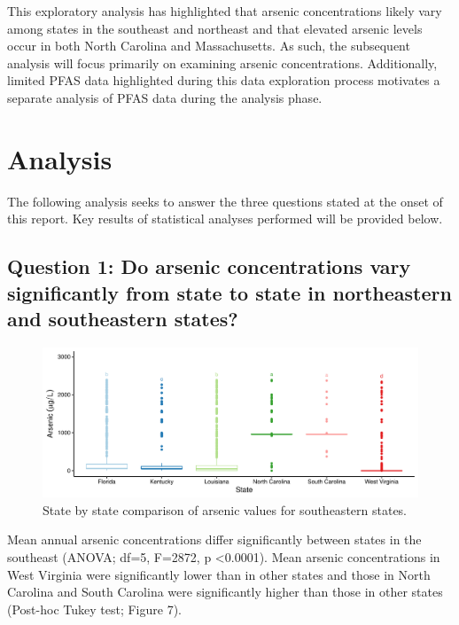 \documentclass[12pt,]{article}
\begin{document}
This exploratory analysis has highlighted that arsenic concentrations
likely vary among states in the southeast and northeast and that
elevated arsenic levels occur in both North Carolina and Massachusetts.
As such, the subsequent analysis will focus primarily on examining
arsenic concentrations. Additionally, limited PFAS data highlighted
during this data exploration process motivates a separate analysis of
PFAS data during the analysis phase.

\newpage

\hypertarget{analysis}{%
\section{Analysis}\label{analysis}}

The following analysis seeks to answer the three questions stated at the
onset of this report. Key results of statistical analyses performed will
be provided below.

\hypertarget{question-1-do-arsenic-concentrations-vary-significantly-from-state-to-state-in-northeastern-and-southeastern-states}{%
\subsection{Question 1: Do arsenic concentrations vary significantly
from state to state in northeastern and southeastern
states?}\label{question-1-do-arsenic-concentrations-vary-significantly-from-state-to-state-in-northeastern-and-southeastern-states}}

\begin{figure}
\centering
\includegraphics{Project_Template_files/figure-latex/figs7-1.pdf}
\caption{State by state comparison of arsenic values for southeastern
states.}
\end{figure}

Mean annual arsenic concentrations differ significantly between states
in the southeast (ANOVA; df=5, F=2872, p \textless{}0.0001). Mean
arsenic concentrations in West Virginia were significantly lower than in
other states and those in North Carolina and South Carolina were
significantly higher than those in other states (Post-hoc Tukey test;
Figure 7).
\end{document}

